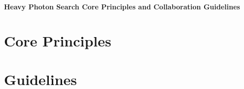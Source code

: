\documentclass[12pt]{article}
\begin{document}
\begin{center}
\Large
\textbf{Heavy Photon Search Core Principles and Collaboration Guidelines}
\end{center}

\normalsize
\tableofcontents
\clearpage

\section{Core Principles}

\section{Guidelines}
\end{document}
